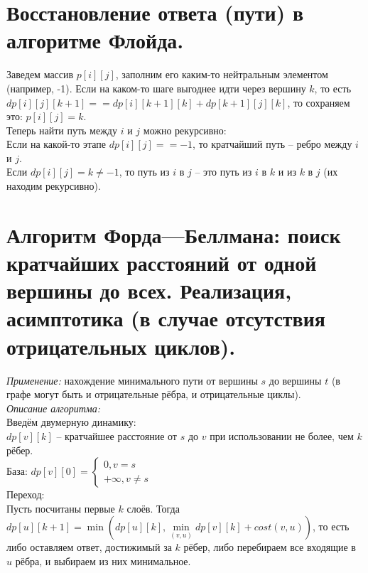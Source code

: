     

\setcounter{section}{54}
\section{Восстановление ответа (пути) в алгоритме Флойда.}

Заведем массив $p[i][j]$, заполним его каким-то нейтральным элементом (например, -1). Если на каком-то шаге выгоднее идти через вершину $k$, то есть $dp[i][j][k + 1] == dp[i][k + 1][k] + dp[k + 1][j][k]$, то сохраняем это: $p[i][j] = k$.\\

Теперь найти путь между $i$ и $j$ можно рекурсивно:\\
Если на какой-то этапе $dp[i][j] == -1$, то кратчайший путь -- ребро между $i$ и $j$.\\
Если $dp[i][j] = k \neq -1$, то путь из $i$ в $j$ -- это путь из $i$ в $k$ и из $k$ в $j$ (их находим рекурсивно).


\setcounter{section}{55}
\section{Алгоритм Форда—Беллмана: поиск кратчайших расстояний от одной вершины до всех. Реализация, асимптотика (в случае отсутствия отрицательных циклов).}

\textit{Применение: } нахождение минимального пути от вершины $s$ до вершины $t$ (в графе могут быть и отрицательные рёбра, и отрицательные циклы).\\

\textit{Описание алгоритма: }\\
    
Введём двумерную динамику:\\
$dp[v][k]$ -- кратчайшее расстояние от $s$ до $v$ при использовании не более, чем $k$ рёбер.\\

База: $dp[v][0] = 
\begin{cases}
    0, v = s\\
    +\infty, v \neq s
\end{cases}
$\\

Переход:\\
Пусть посчитаны первые $k$ слоёв. Тогда $dp[u][k + 1] = \min(dp[u][k], \min\limits_{(v, u)} dp[v][k] + cost(v, u))$, то есть либо оставляем ответ, достижимый за $k$ рёбер, либо перебираем все входящие в $u$ рёбра, и выбираем из них минимальное.\\


